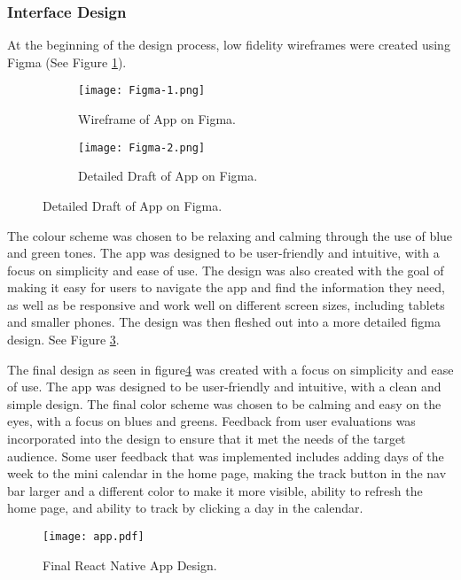 \subsubsection{Interface Design}
At the beginning of the design process, low fidelity wireframes were created using Figma (See Figure \ref{figure:figma-1}).
\begin{figure}[h!!]
  \begin{subfigure}{.5\textwidth}
    \begin{center}
      \texttt{[image: Figma-1.png]}
      \caption{Wireframe of App on Figma.}
      \label{figure:figma-1}
    \end{center}
  \end{subfigure}
  \begin{subfigure}{.5\textwidth}
    \begin{center}
      \texttt{[image: Figma-2.png]}
      \caption{Detailed Draft of App on Figma.}
      \label{figure:figma-2}
    \end{center}
  \end{subfigure}
\end{figure}

The colour scheme was chosen to be relaxing and calming  through the use of blue and green tones. The app was designed to be user-friendly and intuitive, with a focus on simplicity and ease of use. The design was also created with the goal of making it easy for users to navigate the app and find the information they need, as well as be responsive and work well on different screen sizes, including tablets and smaller phones. The design was then fleshed out into a more detailed figma design. See Figure \ref{figure:figma-2}.

The final design as seen in figure\ref{figure:app} was created with a focus on simplicity and ease of use. The app was designed to be user-friendly and intuitive, with a clean and simple design. The final color scheme was chosen to be calming and easy on the eyes, with a focus on blues and greens. Feedback from user evaluations was incorporated into the design to ensure that it met the needs of the target audience. Some user feedback that was implemented includes adding days of the week to the mini calendar in the home page, making the track button in the nav bar larger and a different color to make it more visible, ability to refresh the home page, and ability to track by clicking a day in the calendar. 
\begin{figure}[h!!]
  \begin{center}
    \texttt{[image: app.pdf]}
    \caption{Final React Native App Design.}
    \label{figure:app}
  \end{center}
\end{figure}

